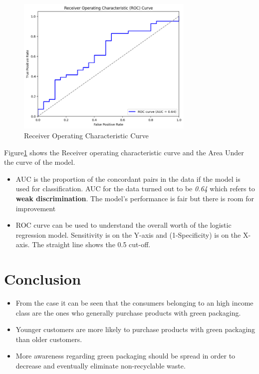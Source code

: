 \documentclass[a4paper,10pt]{article}
\begin{document}
\vspace{10pt}
\begin{figure}[ht]
\centering
\includegraphics[height=6.6cm]{figures/AUC_ROC.png}
\caption{Receiver Operating Characteristic Curve} 
\label{auc}
\end{figure} 

\vspace{30pt}
Figure\ref{auc} shows the Receiver operating characteristic curve and the Area Under the curve of the model.
\begin{itemize}
    \item AUC is the proportion of the concordant pairs in the data if the model is used for classification. AUC for the data turned out to be \textit{0.64} which refers to \textbf{weak discrimination}. The model's performance is fair but there is room for improvement

    \item ROC curve can be used to understand the overall worth of the logistic regression model. Sensitivity is on the Y-axis and (1-Specificity) is on the X-axis. The straight line shows the 0.5 cut-off.
\end{itemize}


\section{Conclusion}
\begin{itemize}
    \item From the case it can be seen that the consumers belonging to an high income class are the ones who generally purchase products with green packaging. 
    \item Younger customers are more likely to purchase products with green packaging than older customers. 
    \item More awareness regarding green packaging should be spread in order to decrease and eventually eliminate non-recyclable waste.
\end{itemize}
\end{document}
